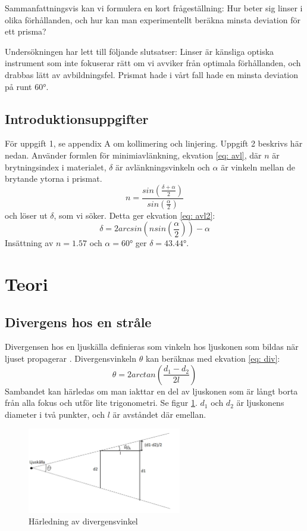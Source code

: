 \documentclass[a4paper]{article}
\begin{document}
Sammanfattningsvis kan vi formulera en kort frågeställning: Hur beter sig linser i olika förhållanden, och hur kan man experimentellt beräkna minsta deviation
för ett prisma?

Undersökningen har lett till följande slutsatser: Linser är känsliga optiska instrument som inte fokuserar rätt om vi avviker från optimala förhållanden,
och drabbas lätt av avbildningsfel. Prismat hade i vårt fall hade en minsta deviation på runt \ang{60}. 
\subsection{Introduktionsuppgifter}
För uppgift 1, se appendix A om kollimering och linjering. 
Uppgift 2 beskrivs här nedan.
Använder formlen för minimiavlänkning, ekvation \ref{eq: avl}\cite[p. 212]{vl}, där $n$ är brytningsindex i materialet, $\delta$ är avlänkningsvinkeln och 
$\alpha$ är vinkeln mellan de brytande ytorna i prismat.
\begin{equation}
    \label{eq: avl}
    n = \frac{sin(\frac{\delta +\alpha}{2})}{sin(\frac{\alpha}{2})}
\end{equation}
och löser ut $\delta$, som vi söker. Detta ger ekvation \ref{eq: avl2}:
\begin{equation}
    \label{eq: avl2}
    \delta = 2 arcsin(n sin(\frac{\alpha}{2})) - \alpha
\end{equation}
Insättning av $n=1.57$ och $\alpha = \ang{60}$ ger $\delta = \ang{43.44}$.

\section{Teori}
\subsection{Divergens hos en stråle}
Divergensen hos en ljuskälla definieras som vinkeln hos ljuskonen som bildas när ljuset propagerar \cite{wiki}. Divergensvinkeln $\theta$ kan beräknas med ekvation \ref{eq: div}:
\begin{equation}
    \theta = 2 arctan(\frac{d_1 - d_2}{2l})
    \label{eq: div}
\end{equation}
Sambandet kan härledas om man iakttar en del av ljuskonen som är långt borta från alla fokus och utför lite trigonometri. Se figur \ref{fig:divergens}. $d_1$ och $d_2$
är ljuskonens diameter i två punkter, och $l$ är avståndet där emellan.  
\begin{figure}[h!]
    \centering
    \includegraphics[width=0.6\textwidth]{divergens}
    \caption{Härledning av divergensvinkel}
    \label{fig:divergens}
\end{figure}
\pagebreak
\end{document}
